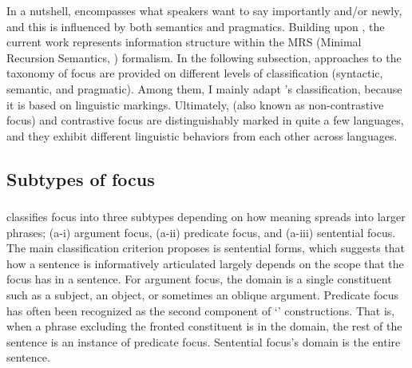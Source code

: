 

\noindent In a nutshell,  encompasses what speakers want to say
importantly and/or newly, and this is influenced by both semantics and
pragmatics.  Building upon , the current work
represents information structure within the MRS (Minimal
Recursion Semantics, \citealt{copestake:etal:05}) formalism.  In the
following subsection, approaches to the taxonomy of focus are provided
on different levels of classification (syntactic, semantic, and
pragmatic). Among them, I mainly adapt \citeauthor{gundel:99}'s
classification, because it is based on linguistic
markings. Ultimately, 
(also known as non-contrastive focus)
and contrastive focus are distinguishably marked in quite a few
languages, and they exhibit different linguistic behaviors from each
other across languages.




\subsection{Subtypes of focus}
\label{3:ssec:subtypes-focus}


\subsubsection{\citet{lambrecht:96}}
\label{3:sssec:lambrecht}

\citeauthor{lambrecht:96} classifies focus into three subtypes
depending on how  meaning spreads into larger phrases; (a-i)
argument focus, (a-ii) predicate focus, and (a-iii) sentential
focus. The main classification criterion \citeauthor{lambrecht:96}
proposes is sentential forms, which suggests that how a sentence is
informatively articulated largely depends on the scope that the focus
has in a sentence.  For argument focus, the domain is a single
constituent such as a subject, an object, or sometimes an oblique
argument.  Predicate focus has often been recognized as the second
component of `' constructions. That is, when a phrase
excluding the fronted constituent is in the  domain, the rest of
the sentence is an instance of predicate focus.  Sentential focus's
domain is the entire sentence.


